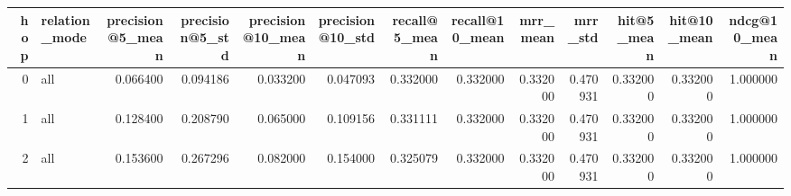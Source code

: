 \begin{tabular}{rlrrrrrrrrrrr}
\toprule
hop & relation_mode & precision@5_mean & precision@5_std & precision@10_mean & precision@10_std & recall@5_mean & recall@10_mean & mrr_mean & mrr_std & hit@5_mean & hit@10_mean & ndcg@10_mean \\
\midrule
0 & all & 0.066400 & 0.094186 & 0.033200 & 0.047093 & 0.332000 & 0.332000 & 0.332000 & 0.470931 & 0.332000 & 0.332000 & 1.000000 \\
1 & all & 0.128400 & 0.208790 & 0.065000 & 0.109156 & 0.331111 & 0.332000 & 0.332000 & 0.470931 & 0.332000 & 0.332000 & 1.000000 \\
2 & all & 0.153600 & 0.267296 & 0.082000 & 0.154000 & 0.325079 & 0.332000 & 0.332000 & 0.470931 & 0.332000 & 0.332000 & 1.000000 \\
\bottomrule
\end{tabular}
